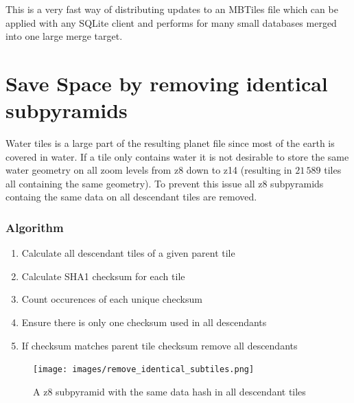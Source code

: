 This is a very fast way of distributing updates to an MBTiles file which can be applied with any SQLite client and performs for many small databases merged into one large merge target.

\newpage{}
\section{Save Space by removing identical subpyramids}

Water tiles is a large part of the resulting planet file since most of the earth is covered in water.
If a tile only contains water it is not desirable to store the same water geometry on all zoom levels
from z8 down to z14 (resulting in $21\,589$ tiles all containing the same geometry).
To prevent this issue all z8 subpyramids containg the same data on all descendant tiles are removed.

\subsubsection*{Algorithm}

\begin{enumerate}  
    \item Calculate all descendant tiles of a given parent tile
    \item Calculate SHA1 checksum for each tile
    \item Count occurences of each unique checksum
    \item Ensure there is only one checksum used in all descendants
    \item If checksum matches parent tile checksum remove all descendants
\end{enumerate}


\begin{figure}[H]
  \centering
  \texttt{[image: images/remove\_identical\_subtiles.png]}
  \caption{A z8 subpyramid with the same data hash in all descendant tiles}
\end{figure}
